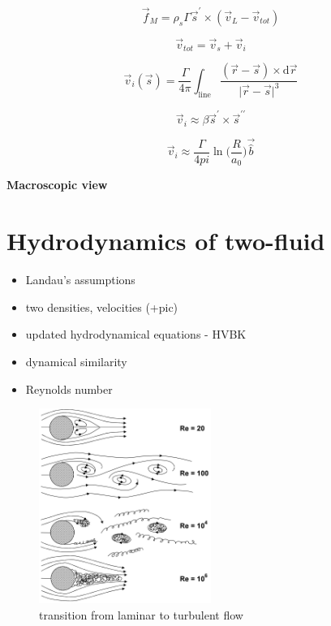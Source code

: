 $$
\vec{f}_M = \rho_s \Gamma \vec{s}^{\prime} \times (\vec{v}_L - \vec{v}_{tot})
$$

$$
\vec{v}_{tot} = \vec{v}_s + \vec{v}_i
$$

$$
\vec{v}_i(\vec{s}) = \frac{\Gamma}{4\pi} \int_{\text{line}} \frac{(\vec{r} - \vec{s}) \times \text{d}\vec{r}}{\vert \vec{r} - \vec{s} \vert^3}
$$

$$
\vec{v}_i \approx \beta \vec{s}^{\prime} \times \vec{s}^{\prime \prime}
$$

$$
\vec{v}_i \approx \frac{\Gamma}{4pi} \ln\Big(\frac{R}{a_0}\Big) \vec{\hat{b}}
$$



\newpage

{\Huge \bfseries Macroscopic view}
\vspace{0.3cm}

\section{Hydrodynamics of two-fluid}
\begin{itemize}
	\item Landau's assumptions
	\item two densities, velocities (+pic)
	\item updated hydrodynamical equations - HVBK
	\item dynamical similarity
	\item Reynolds number
\end{itemize}

\begin{figure}[h]
	\centering
	\includegraphics[width=0.5\textwidth]{graphics/theory/laminar-turbulent}
	\caption{transition from laminar to turbulent flow}
	\label{laminar-turbulent}
\end{figure}

